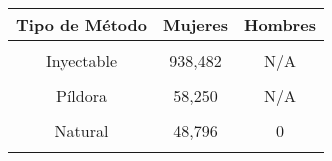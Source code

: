 \begin{tabular}[t]{ccc}
\toprule
\textbf{Tipo de Método} & \textbf{Mujeres} & \textbf{Hombres}\\
\midrule
\cellcolor[HTML]{B6B3FF}{Barrera} & \cellcolor[HTML]{B6B3FF}{48,262} & \cellcolor[HTML]{B6B3FF}{25,811}\\
Inyectable & 938,482 & N/A\\
\cellcolor[HTML]{B6B3FF}{DIU} & \cellcolor[HTML]{B6B3FF}{5,100} & \cellcolor[HTML]{B6B3FF}{N/A}\\
Píldora & 58,250 & N/A\\
\cellcolor[HTML]{B6B3FF}{Implante subdérmico} & \cellcolor[HTML]{B6B3FF}{32,172} & \cellcolor[HTML]{B6B3FF}{N/A}\\
Natural & 48,796 & 0\\
\cellcolor[HTML]{B6B3FF}{Quirúrgico} & \cellcolor[HTML]{B6B3FF}{4,527} & \cellcolor[HTML]{B6B3FF}{166}\\
\bottomrule
\end{tabular}
